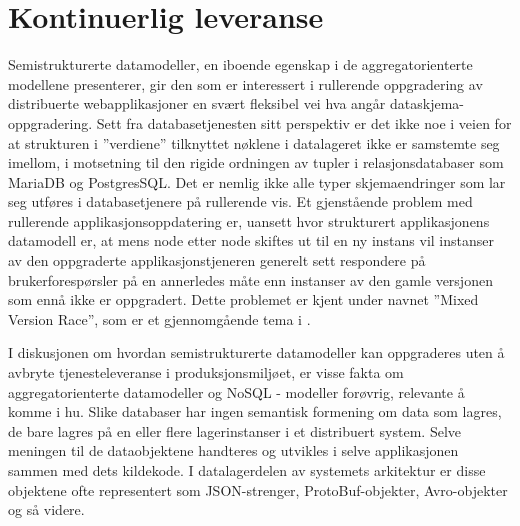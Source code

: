 \section{Kontinuerlig leveranse}


Semistrukturerte datamodeller, en iboende egenskap i de aggregatorienterte modellene \cite{sadalage2013} presenterer, gir den som er interessert i rullerende oppgradering av distribuerte webapplikasjoner en svært fleksibel vei hva angår dataskjema-oppgradering. Sett fra databasetjenesten sitt perspektiv er det ikke noe i veien for at strukturen i ''verdiene'' tilknyttet nøklene i datalageret ikke er samstemte seg imellom, i motsetning til den rigide ordningen av tupler i relasjonsdatabaser som MariaDB og PostgresSQL. Det er nemlig ikke alle typer skjemaendringer som lar seg utføres i databasetjenere på rullerende vis. Et gjenstående problem med rullerende applikasjonsoppdatering er, uansett hvor strukturert applikasjonens datamodell er, at mens node etter node skiftes ut til en ny instans vil instanser av den oppgraderte applikasjonstjeneren generelt sett respondere på brukerforespørsler på en annerledes måte enn instanser av den gamle versjonen som ennå ikke er oppgradert. Dette problemet er kjent under navnet ''Mixed Version Race'', som er et gjennomgående tema i \cite{dumitras2010upgrade,dumitracs2009upgrades}.

I diskusjonen om hvordan semistrukturerte datamodeller kan oppgraderes uten å avbryte tjenesteleveranse i produksjonsmiljøet, er visse fakta om aggregatorienterte datamodeller og NoSQL - modeller forøvrig, relevante å komme i hu. Slike databaser har ingen semantisk formening om data som lagres, de bare lagres på en eller flere lagerinstanser i et distribuert system. Selve meningen til de dataobjektene handteres og utvikles i selve applikasjonen sammen med dets kildekode. I datalagerdelen av systemets arkitektur er disse objektene ofte representert som JSON-strenger, ProtoBuf-objekter, Avro-objekter og så videre.



